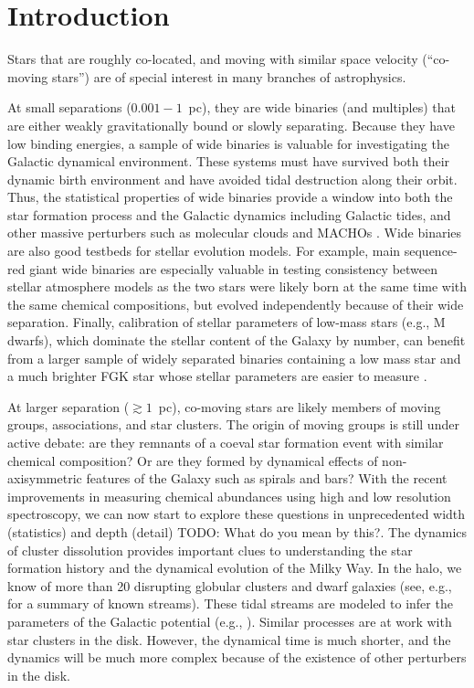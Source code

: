 \documentclass[manuscript, letterpaper]{aastex6}
\newcommand{\todo}[1]{{\color{red}TODO: #1}}
\begin{document}

\section{Introduction} \label{sec:intro}

Stars that are roughly co-located, and moving with similar space velocity (``co-moving stars'')
are of special interest in many branches of astrophysics.

At small separations ($0.001-1$~pc), they are wide binaries (and
multiples) that are either weakly gravitationally bound or
slowly separating.
Because they have low binding energies, a sample of wide binaries is valuable
for investigating the Galactic dynamical environment.
These systems must have survived both their dynamic birth environment and 
have avoided tidal destruction along their orbit.
Thus, the statistical properties of wide binaries provide a window into both the star formation
process and the Galactic dynamics
including Galactic tides, and other massive perturbers such as molecular clouds
and MACHOs \citep{Yoo:2004aa,Allen:2014aa}.
Wide binaries are also good testbeds for stellar evolution models.
For example, main sequence-red giant wide binaries are especially valuable in
testing consistency between stellar atmosphere models as the
two stars were likely born at the same time with the same chemical compositions,
but evolved independently because of their wide separation.
Finally, calibration of stellar parameters of low-mass stars (e.g., M dwarfs),
which dominate the stellar content of the Galaxy by number, can benefit from
a larger sample of widely separated binaries containing a low mass star and a
much brighter FGK star whose stellar parameters are easier to measure
\citep[e.g.,][]{Rojas-Ayala:2012aa}.

At larger separation ($\gtrsim 1$~pc), co-moving stars are likely members of
moving groups, associations, and star clusters.
The origin of moving groups is still under active debate: are they remnants of a coeval
star formation event with similar chemical composition? Or are they formed by
dynamical effects of non-axisymmetric features of the Galaxy such as spirals
and bars? With the recent improvements in measuring chemical abundances
using high and low resolution spectroscopy, we can now start to explore these questions
in unprecedented width (statistics) and depth (detail) \todo{What do you mean by this?}.
The dynamics of cluster dissolution provides important clues to understanding
the star formation history and the dynamical evolution of the Milky Way.
In the halo, we know of more than 20 disrupting globular clusters and dwarf galaxies
(see, e.g., \citealt{Grillmair:2016} for a summary of known streams).
These tidal streams are modeled to infer the parameters of the Galactic
potential (e.g., \citealt{Kupper:2015}).
Similar processes are at work with star clusters in the disk.
However, the dynamical time is much shorter, and the dynamics will be much more
complex because of the existence of other perturbers in the disk.
\end{document}

